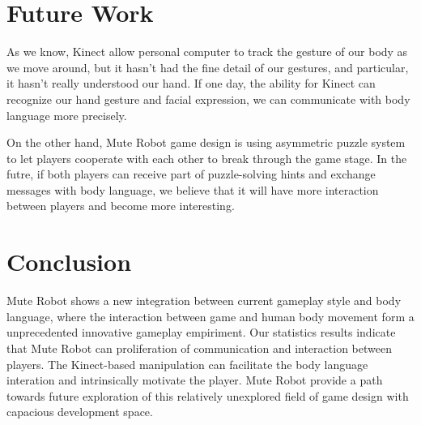 \documentclass{chi-ext}
\begin{document}




\section{Future Work}

As we know, Kinect allow personal computer to track the gesture of our body as we move around, but it hasn't had the fine detail of our gestures, and particular, it hasn't really understood our hand. If one day, the ability for Kinect can recognize our hand gesture and facial expression, we can communicate with body language more precisely. 

On the other hand, Mute Robot game design is using asymmetric puzzle system to let players cooperate with each other to break through the game stage. In the futre, if both players can receive part of puzzle-solving hints and exchange messages with body language, we believe that it will have more interaction between players and become more interesting.


\section{Conclusion}
Mute Robot shows a new integration between current gameplay style and body language, where the interaction between game and human body movement form a unprecedented innovative gameplay empiriment.
Our statistics results indicate that Mute Robot can proliferation of communication and interaction between players.
The Kinect-based manipulation can facilitate the body language interation and intrinsically motivate the player.
Mute Robot provide a path towards future exploration of this relatively unexplored field of game design with capacious development space.
\end{document}
